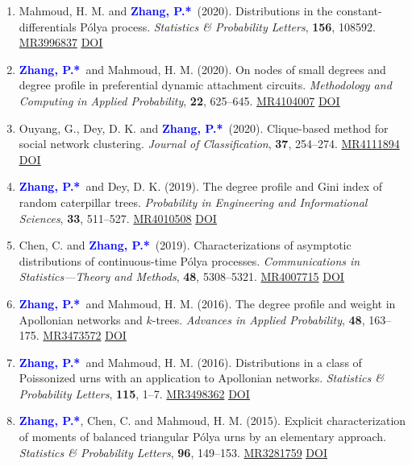 \documentclass{res}
\def\MR#1{\href{http://www.ams.org/mathscinet-getitem?mr=#1}{MR#1}}
\newcommand{\PZ}{\textbf{\textcolor{blue}{Zhang, P.*}}}
\begin{document}
\begin{resume}
\begin{enumerate}
	\item {\sc Mahmoud, H. M.} and \PZ\ (2020). 
	Distributions in the constant-differentials P\'{o}lya process. 
	{\em Statistics \& Probability Letters}, \textbf{156}, 108592. 
	\MR{3996837}
	\href{https://doi.org/10.1016/j.spl.2019.108592}
	{\underline{DOI}}
		
	\item \PZ\ and {\sc Mahmoud, H. M.} (2020). On 
	nodes of small degrees and degree profile in preferential 
	dynamic attachment circuits. {\em Methodology and Computing in 
	Applied Probability}, \textbf{22}, 625--645. \MR{4104007}
	\href{https://doi.org/10.1007/s11009-019-09726-4}
	{\underline{DOI}}

	\item {\sc Ouyang, G., Dey, D. K.} and \PZ\ (2020). 
	Clique-based method for social network clustering. {\em Journal 
	of 
	Classification}, \textbf{37}, 254--274. \MR{4111894}
	\href{https://doi.org/10.1007/s00357-019-9310-5}
	{\underline{DOI}}
	
	\item \PZ\ and {\sc Dey, D. K.} (2019). The degree 
	profile and Gini index of random caterpillar trees. {\em 
	Probability in Engineering and Informational Sciences}, 
	\textbf{33}, 511--527. \MR{4010508}
	\href{https://doi.org/10.1017/S0269964818000475}
	{\underline{DOI}}
		
	\item {\sc Chen, C.} and \PZ\ (2019). Characterizations of 
	asymptotic distributions of continuous-time P\'{o}lya processes. 
	{\em Communications in Statistics---Theory and Methods}, 
	\textbf{48}, 5308--5321. \MR{4007715}
	\href{https://doi.org/10.1080/03610926.2018.1510005}
	{\underline{DOI}}
	
	\item \PZ\ and {\sc Mahmoud, H. M.} (2016). The 
	degree profile and weight in Apollonian networks and $k$-trees. 
	\emph{Advances in Applied Probability}, \textbf{48}, 163--175. 
	\MR{3473572}
	\href{https://doi.org/10.1017/apr.2015.11}
	{\underline{DOI}}
		
	\item \PZ\ and {\sc Mahmoud, H. M.} (2016). 
	Distributions in a class of Poissonized urns with an application 
	to Apollonian networks. \emph{Statistics \& Probability 
	Letters}, {\bf 115}, 1--7. \MR{3498362}
	\href{https://doi.org/10.1016/j.spl.2016.03.023}
	{\underline{DOI}}

	\item \PZ, {\sc Chen, C.} and {\sc Mahmoud, H. M.} 
	(2015). Explicit characterization of moments of balanced 
	triangular P\'{o}lya urns by an elementary approach. 
	\emph{Statistics \& Probability Letters}, {\bf 96}, 149--153. 
	\MR{3281759}
	\href{https://doi.org/10.1016/j.spl.2014.09.016}
	{\underline{DOI}}	
\end{enumerate} 


\end{resume}
\end{document}
